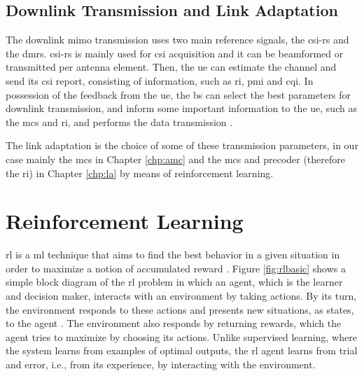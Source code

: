 
\subsection{Downlink Transmission and Link Adaptation}

The downlink \gls{mimo} transmission uses two main reference signals, the \gls{csi}-\gls{rs} and the \gls{dmrs}.
%
\Gls{csi}-\gls{rs} is mainly used for \gls{csi} acquisition and it can be beamformed or transmitted per antenna element.
%
Then, the \gls{ue} can estimate the channel and send its \gls{csi} report, consisting of information, such as \gls{ri}, \gls{pmi} and \gls{cqi}.
%
In possession of the feedback from the \gls{ue}, the \gls{bs} can select the best parameters for downlink transmission, and inform some important information to the \gls{ue}, such as the \gls{mcs} and \gls{ri}, and performs the data transmission \cite{AliZaidi632018}.

The link adaptation is the choice of some of these transmission parameters, in our case mainly the \gls{mcs} in Chapter \ref{chp:amc} and the \gls{mcs} and precoder (therefore the \gls{ri}) in Chapter \ref{chp:la} by means of reinforcement learning.

\section{Reinforcement Learning }
\label{sec:rl-theory}
\Gls{rl} is a \gls{ml} technique that aims to find the best behavior in a given situation in order to maximize a notion of accumulated reward \cite{Bishop07,survey-son}.
%
Figure \ref{fig:rlbasic} shows a simple block diagram of the \gls{rl} problem in which an agent, which is the learner and decision maker, interacts with an environment by taking actions.
%
By its turn, the environment responds to these actions and presents new situations, as states, to the agent \cite{sutton2018rl}.
%
The environment also responds by returning rewards, which the agent tries to maximize by choosing its actions.
%
Unlike supervised learning, where the system learns from examples of optimal outputs, the \gls{rl} agent learns from trial and error, i.e., from its experience, by interacting with the environment.

